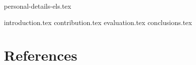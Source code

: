 \documentclass[twocolumn,preprint,3p,number]{template/elsarticle}
\theoremstyle{plain}
\theoremstyle{definition}
\begin{document}
	{personal-details-els.tex}

	{introduction.tex}
	{contribution.tex}
	{evaluation.tex}
	{conclusions.tex}

  \section*{References}
	
	
\end{document}
